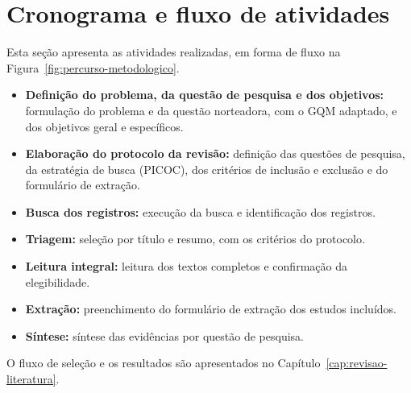 \section{Cronograma e fluxo de atividades}

Esta seção apresenta as atividades realizadas, em forma de fluxo na
Figura~\ref{fig:percurso-metodologico}.

\begin{itemize}
\item \textbf{Definição do problema, da questão de pesquisa e dos objetivos:}
formulação do problema e da questão norteadora, com o GQM adaptado, e dos
objetivos geral e específicos.
\item \textbf{Elaboração do protocolo da revisão:} definição das questões de
pesquisa, da estratégia de busca (PICOC), dos critérios de inclusão e exclusão
e do formulário de extração.
\item \textbf{Busca dos registros:} execução da busca e identificação dos
registros.
\item \textbf{Triagem:} seleção por título e resumo, com os critérios do
protocolo.
\item \textbf{Leitura integral:} leitura dos textos completos e confirmação da
elegibilidade.
\item \textbf{Extração:} preenchimento do formulário de extração dos estudos
incluídos.
\item \textbf{Síntese:} síntese das evidências por questão de pesquisa.
\end{itemize}

O fluxo de seleção e os resultados são apresentados no
Capítulo~\ref{cap:revisao-literatura}.
